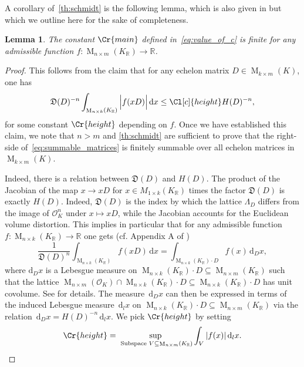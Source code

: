 \documentclass{amsart}
\newtheorem{lemma}[theorem]{Lemma}
\theoremstyle{definition}
\theoremstyle{remark}
\newcommand{\OK}{\mathcal{O}_K}
\newcommand{\KR}{K_\mathbb{R}}
\newcommand{\diff}{\,\mathrm{d}}
\DeclareMathOperator{\M}{M}
\begin{document}
A corollary of~\cref{th:schmidt} is the following lemma, which is also given in \cite[Corollary 17]{GSV23} but which we outline here for the sake of completeness.

\begin{lemma}
    \label{le:schmidt_makes_c1_finite}
    The constant $\Cr{main}$ defined in~\cref{eq:value_of_c} is finite for any admissible function $f: \M_{n \times m }(\KR) \rightarrow  \mathbb{R}$.
\end{lemma}
\begin{proof}
    This follows from the claim that for any echelon matrix $D \in \M_{k \times m}(K)$, one has 
    \begin{equation}
        \mathfrak{D}(D)^{-n}\int_{\M_{n \times k}(\KR)}^{}\Big| f(xD) \Big|\diff x  \leq \Cl[c]{height} H(D)^{-n},
        \label{eq:summable_matrices}
    \end{equation}
    for some constant $\Cr{height}$ depending on $f$. Once we have established this claim, we note that $n>m$ and \cref{th:schmidt} are sufficient to prove that the right-side of~\cref{eq:summable_matrices} is finitely summable over all echelon matrices in $\M_{k \times m}(K)$. 

    Indeed, there is a relation between $\mathfrak{D}(D)$ and $H(D)$. The product of the Jacobian of the map $x \rightarrow x D$ for $x \in M_{1 \times k}(K_\mathbb{R})$ times the factor $\mathfrak{D}(D)$ is exactly $H(D)$. 
   Indeed, $\mathfrak{D}(D)$ is the index by which the lattice $\Lambda_D$ differs from the image of $\mathcal{O}_{K}^{n}$ under $x\mapsto xD$, while the Jacobian accounts for the Euclidean volume distortion.
    This implies in particular that for any admissible function $f: \M_{n \times k}(\KR) \rightarrow  \mathbb{R}$ one gets (cf. Appendix A of \cite{GSV23})
    \begin{equation}
        \frac{1}{\mathfrak{D}(D)^{n}} \int_{\M_{n\times k}(K_\mathbb{R})} f( x D) \diff x = \int_{\M_{n \times k}(\KR) \cdot D} f(x) {\diff_{D}} x,
        \label{eq:d_D_defined}
    \end{equation}
    where $\mathrm{d}_D x$ is a Lebesgue measure on $\M_{n \times k}(\KR) \cdot D \subseteq \M_{n \times m}(\KR)$ 
    such that the lattice $\M_{n \times m}(\OK) \cap \M_{n \times k}(\KR) \cdot D  \subseteq \M_{n\times k}(K_\mathbb{R})\cdot D$
    has unit covolume. 
    See \cite[\S 3]{GSV23} for details. The measure $\diff _D x$ can then be expressed in terms of the induced Lebesgue measure $\diff_{l} x$ on $\M_{n\times k}(K_\mathbb{R})\cdot D \subseteq \M_{n \times m}(\KR)$ via the relation $\diff_{D} x  = H(D)^{-n} \diff_{l} x$. 
    We pick $\Cr{height}$ by setting
    \begin{equation}
        \Cr{height} = \sup_{\text{ Subspace }V \subseteq \M_{n \times m}(\KR)} \int_{V}^{} |f(x)|\diff_{l} x.
    \end{equation}
\end{proof}
\end{document}
